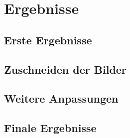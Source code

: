 \section{Ergebnisse}

\subsection{Erste Ergebnisse}

\subsection{Zuschneiden der Bilder}

\subsection{Weitere Anpassungen}

\subsection{Finale Ergebnisse}